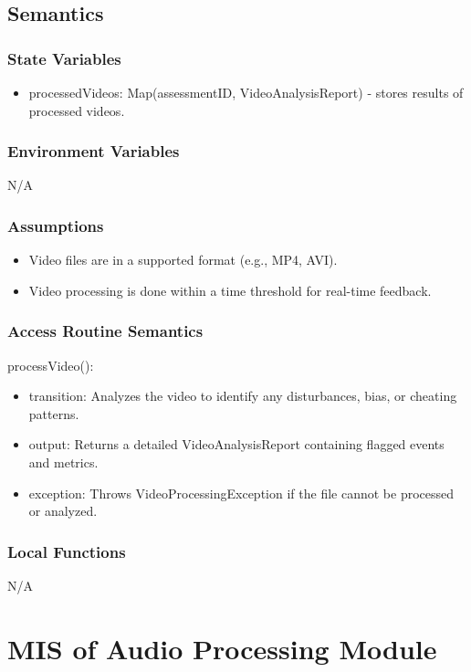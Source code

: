 \documentclass[12pt, titlepage]{article}
\begin{document}
\subsection{Semantics}

\subsubsection{State Variables}
\begin{itemize}
\item processedVideos: Map(assessmentID, VideoAnalysisReport) - stores results of processed videos.
\end{itemize}

\subsubsection{Environment Variables}
N/A

\subsubsection{Assumptions}
\begin{itemize}
\item Video files are in a supported format (e.g., MP4, AVI).
\item Video processing is done within a time threshold for real-time feedback.
\end{itemize}

\subsubsection{Access Routine Semantics}

\noindent processVideo():
\begin{itemize}
\item transition: Analyzes the video to identify any disturbances, bias, or cheating patterns.
\item output: Returns a detailed VideoAnalysisReport containing flagged events and metrics.
\item exception: Throws VideoProcessingException if the file cannot be processed or analyzed.
\end{itemize}

\subsubsection{Local Functions}
N/A

\section{MIS of Audio Processing Module} \label{AudioProcessingModule}
\end{document}
